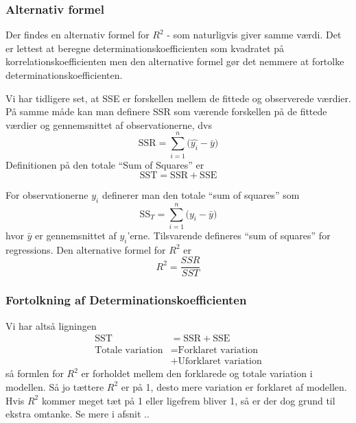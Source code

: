 \subsubsection{Alternativ formel}
Der findes en alternativ formel for \(R^2\) - som naturligvis giver samme værdi. Det er lettest at beregne determinationskoefficienten som kvadratet på korrelationskoefficienten men den alternative formel gør det nemmere at fortolke determinationskoefficienten.

Vi har tidligere set, at SSE er forskellen mellem de fittede og observerede værdier. På samme måde kan man definere SSR som værende forskellen på de fittede værdier og gennemsnittet af observationerne, dvs
\begin{displaymath}
    \textrm{SSR} = \sum_{i=1}^{n} \Big( \widehat{y_i} - \bar{y} \Big)
\end{displaymath}
Definitionen på den totale ``Sum of Squares'' er
\begin{displaymath}
    \textrm{SST} = \textrm{SSR} + \textrm{SSE}
\end{displaymath}

For observationerne \(y_i\) definerer man den totale ``sum of squares'' som
\begin{displaymath}
    \textrm{SS}_T = \sum_{i=1}^{n} \Big( y_i - \bar{y} \Big )
\end{displaymath}
hvor \(\bar{y}\) er gennemsnittet af \(y_i\)'erne. Tilsvarende defineres  ``sum of squares'' for regressions. Den alternative formel for \(R^2\) er
\begin{displaymath}
    R^2 = \frac{SSR}{SST}
\end{displaymath}

\subsubsection{Fortolkning af Determinationskoefficienten}
Vi har altså ligningen
\begin{equation}
\begin{align}
    \textrm{SST}              &= \textrm{SSR} + \textrm{SSE} \\
    \textrm{Totale variation} &= \textrm{Forklaret variation} \\
                              &+ \textrm{Uforklaret variation}
\end{align}
\end{equation}
så formlen for \(R^2\) er forholdet mellem den forklarede og totale variation i modellen. Så jo tættere \(R^2\) er på 1, desto mere variation er forklaret af modellen. Hvis \(R^2\) kommer meget tæt på 1 eller ligefrem bliver 1, så er der dog grund til ekstra omtanke. Se mere i afsnit ..

